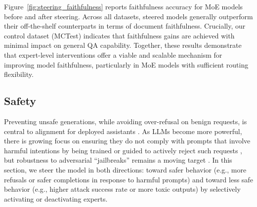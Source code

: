 \documentclass{article} %
\begin{document}
Figure~\ref{fig:steering_faithfulness} reports faithfulness accuracy for MoE models before and after steering. Across all datasets, steered models generally outperform their off-the-shelf counterparts in terms of document faithfulness. Crucially, our control dataset (MCTest) indicates that faithfulness gains are achieved with minimal impact on general QA capability.
Together, these results demonstrate that expert-level interventions offer a viable and scalable mechanism for improving model faithfulness, particularly in MoE models with sufficient routing flexibility.



\subsection{Safety}
\label{sec:safety}
Preventing unsafe generations, while avoiding over-refusal on benign requests, is central to alignment for deployed assistants \citep{xu2021recipessafetyopendomainchatbots, bai2022constitutionalaiharmlessnessai, sun-etal-2022-safety, chujie-safeguarding, openai2024gpt4technicalreport}. As LLMs become more powerful, there is growing focus on ensuring they do not comply with prompts that involve harmful intentions by being trained or guided to actively reject such requests \citep{bai2022traininghelpfulharmlessassistant, shaikh-etal-2023-second}, but robustness to adversarial ``jailbreaks'' remains a moving target \citep{NEURIPS2023_fd661313, liu2024autodan, zeng-etal-2024-johnny, teo2025blessingcursedimensionalitysafety}.
In this section, we steer the model in both directions: toward safer behavior (e.g., more refusals or safer completions in response to harmful prompts) and toward less safe behavior (e.g., higher attack success rate or more toxic outputs) by selectively activating or deactivating experts.
\end{document}
